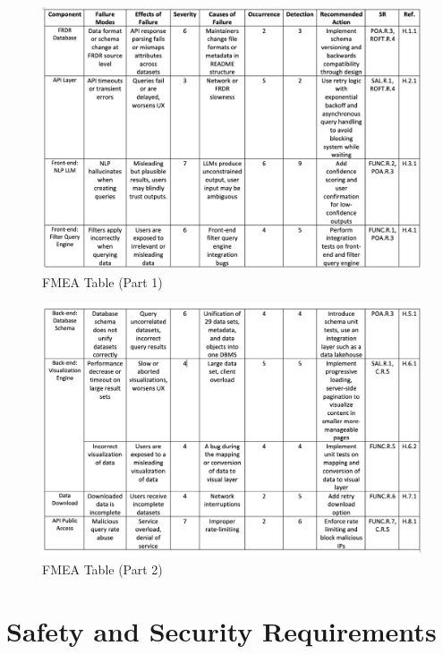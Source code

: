 \documentclass{article}
\begin{document}
\clearpage

\begin{figure}[h]
    \centering
    \includegraphics[width=1\textwidth]{FMEA Table 1.png}
    \caption{FMEA Table (Part 1)}
    \label{fig:TblFMEA1}
\end{figure}

\clearpage

\begin{figure}[h]
    \centering
    \includegraphics[width=1\textwidth]{FMEA Table 2.png}
    \caption{FMEA Table (Part 2)}
    \label{fig:TblFMEA2}
\end{figure}

\section{Safety and Security Requirements}
\end{document}
